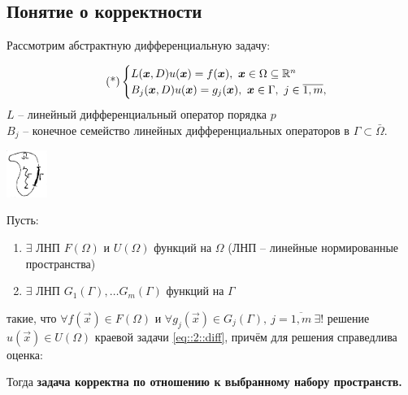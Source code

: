 \documentclass[../main.tex]{subfiles}
\begin{document}
\subsection*{Понятие о корректности}

Рассмотрим абстрактную дифференциальную задачу:

\begin{equation}
\label{eq::2::diff}
\tag{*}
\begin{cases} L(\vec{x}, D)u(\vec{x}) = f(\vec{x}),\ \vec{x} \in \Omega \subseteq \R^n  \\
B_j(\vec{x},D) u(\vec{x}) = g_j(\vec{x}),\ \vec{x}\in \Gamma,\ j\in\overline{1,m},
\end{cases}
\end{equation}
$L$ -- линейный дифференциальный оператор порядка $p$\\
$B_j$ -- конечное семейство линейных дифференциальных операторов в $\Gamma \subset \bar{\Omega}$.

\begin{center}
\includegraphics[width=0.1\textwidth]{2_3_new}
\end{center}

\begin{definition}
Пусть:
\begin{enumerate}[noitemsep]
\item $\exists$ ЛНП $F(\Omega)$ и $U(\Omega)$ функций на $\Omega$ (ЛНП -- линейные нормированные пространства) 
\item $\exists$ ЛНП $G_1(\Gamma),\dots G_m(\Gamma)$ функций на $\Gamma$
\end{enumerate}
такие, что $\forall f(\vec{x}) \in F(\Omega) \text{ и } \forall g_j(\vec{x}) \in G_j(\Gamma),\ j=\overline{1,m}\ \exists!$ решение $u(\vec{x}) \in U(\Omega)$ краевой задачи \eqref{eq::2::diff}, причём для решения справедлива оценка:  

Тогда {\bf задача корректна по отношению к выбранному набору пространств.}
\end{definition}
\end{document}
